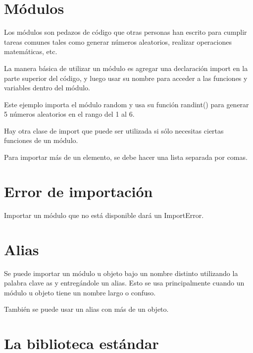 \documentclass{report}
\begin{document}
\section{Módulos}

Los módulos son pedazos de código que otras personas han escrito para cumplir tareas comunes tales como generar números aleatorios, realizar operaciones matemáticas, etc.

La manera básica de utilizar un módulo es agregar una declaración import en la parte superior del código, y luego usar su nombre para acceder a las funciones y variables dentro del módulo.


Este ejemplo importa el módulo random y usa su función randint() para generar 5 números aleatorios en el rango del 1 al 6.

Hay otra clase de import que puede ser utilizada si sólo necesitas ciertas funciones de un módulo.


Para importar más de un elemento, se debe hacer una lista separada por comas.


\section{Error de importación}

Importar un módulo que no está disponible dará un ImportError.


\section{Alias}

Se puede importar un módulo u objeto bajo un nombre distinto utilizando la palabra clave as y entregándole un alias. Esto se usa principalmente cuando un módulo u objeto tiene un nombre largo o confuso.


También se puede usar un alias con más de un objeto.


\section{La biblioteca estándar}
\end{document}
